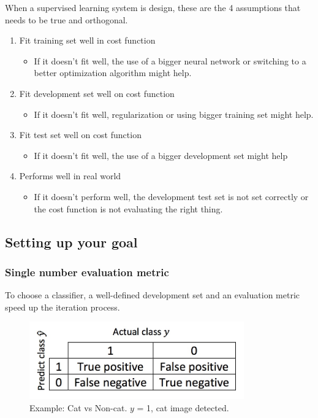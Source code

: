 \documentclass[UTF8]{article}
\begin{document}
When a supervised learning system is design, these are the 4 assumptions that needs to be true and
orthogonal.
\begin{enumerate}
    \item Fit training set well in cost function
    \begin{itemize}
        \item If it doesn’t fit well, the use of a bigger neural network or switching to a better
        optimization algorithm might help.
    \end{itemize}
    \item Fit development set well on cost function
    \begin{itemize}
        \item If it doesn’t fit well, regularization or using bigger training set might help.
    \end{itemize}
    \item Fit test set well on cost function
    \begin{itemize}
        \item If it doesn't fit well, the use of a bigger development set might help
    \end{itemize}
    \item Performs well in real world
    \begin{itemize}
        \item If it doesn't perform well, the development test set is not set correctly or the cost
        function is not evaluating the right thing.
    \end{itemize}
\end{enumerate}

\subsection{Setting up your goal}
\subsubsection{Single number evaluation metric}
To choose a classifier, a well-defined development set and an evaluation metric speed up the
iteration process.

\begin{figure}[htb]
    \centering
    \includegraphics[width=25em]{figures/binary-confusion-matrix}
    \caption{Example: Cat vs Non-cat. $y$ = 1, cat image detected.}
\end{figure}
\end{document}
